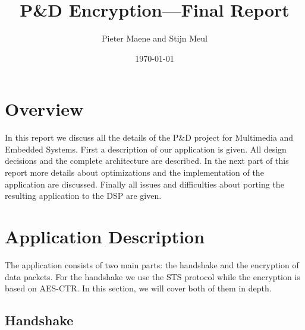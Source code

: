 \documentclass[a4paper]{article}
\title{P\&D Encryption---Final Report}
\author{Pieter Maene and Stijn Meul}
\date{\today}
\begin{document}

\maketitle

\section{Overview}
In this report we discuss all the details of the P\&D project for Multimedia and Embedded Systems. First a description of our application is given. All design decisions and the complete architecture are described. In the next part of this report more details about optimizations and the implementation of the application are discussed. Finally all issues and difficulties about porting the resulting application to the DSP are given.

\section{Application Description}

The application consists of two main parts: the handshake and the encryption of data packets. For the handshake we use the STS protocol while the encryption is based on AES-CTR. In this section, we will cover both of them in depth.

\subsection{Handshake}
\end{document}

